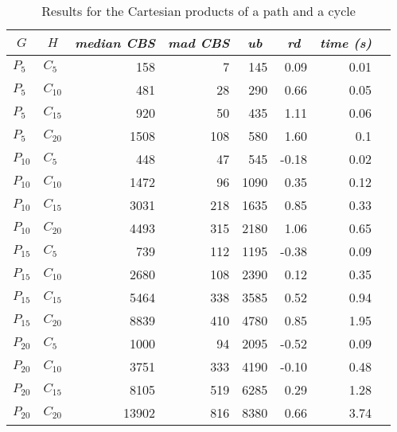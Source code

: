 \documentclass{scrartcl}
\theoremstyle{plain}
\newcommand{\cbs}{CBS}
\begin{document}
\begin{table}[!ht]
	\centering
	\scriptsize
	\begin{tabular}{|ll|rr|r|r|r|r|} 
	\hline
	\multicolumn{1}{|c}{$G$} &
	\multicolumn{1}{c|}{$H$} &
	\multicolumn{1}{c}{\emph{median \cbs{}}} &
	\multicolumn{1}{c|}{\emph{mad \cbs{}}} &
	\multicolumn{1}{c|}{\emph{ub}} &
	\multicolumn{1}{c|}{\emph{rd}} &
	\multicolumn{1}{c|}{\emph{time (s)}} \\ \hline
		
	\makeatletter{}$P_{5}$ & $C_{5}$ & 158 & 7 & 145 & 0.09 & 0.01 \\ 
$P_{5}$ & $C_{10}$ & 481 & 28 & 290 & 0.66 & 0.05 \\ 
$P_{5}$ & $C_{15}$ & 920 & 50 & 435 & 1.11 & 0.06 \\ 
$P_{5}$ & $C_{20}$ & 1508 & 108 & 580 & 1.60 & 0.1 \\ 
$P_{10}$ & $C_{5}$ & 448 & 47 & 545 & -0.18 & 0.02 \\ 
$P_{10}$ & $C_{10}$ & 1472 & 96 & 1090 & 0.35 & 0.12 \\ 
$P_{10}$ & $C_{15}$ & 3031 & 218 & 1635 & 0.85 & 0.33 \\ 
$P_{10}$ & $C_{20}$ & 4493 & 315 & 2180 & 1.06 & 0.65 \\ 
$P_{15}$ & $C_{5}$ & 739 & 112 & 1195 & -0.38 & 0.09 \\ 
$P_{15}$ & $C_{10}$ & 2680 & 108 & 2390 & 0.12 & 0.35 \\ 
$P_{15}$ & $C_{15}$ & 5464 & 338 & 3585 & 0.52 & 0.94 \\ 
$P_{15}$ & $C_{20}$ & 8839 & 410 & 4780 & 0.85 & 1.95 \\ 
$P_{20}$ & $C_{5}$ & 1000 & 94 & 2095 & -0.52 & 0.09 \\ 
$P_{20}$ & $C_{10}$ & 3751 & 333 & 4190 & -0.10 & 0.48 \\ 
$P_{20}$ & $C_{15}$ & 8105 & 519 & 6285 & 0.29 & 1.28 \\ 
$P_{20}$ & $C_{20}$ & 13902 & 816 & 8380 & 0.66 & 3.74 \\ 
 
	
	\hline
	\end{tabular}
	\caption{\label{tab:cart_pc_perf}Results for the Cartesian products of a 
path and a cycle}

\end{table}
\end{document}
